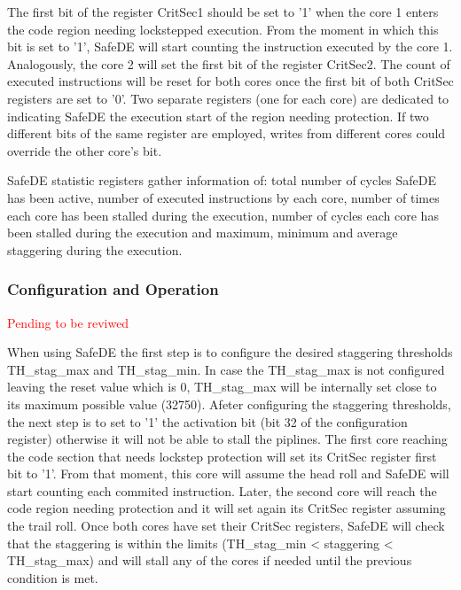 The first bit of the register CritSec1 should be set to '1' when the core 1 enters the code region needing lockstepped execution. From the moment in which this bit is set to '1', SafeDE will start counting the instruction executed by the core 1. Analogously, the core 2 will set the first bit of the register CritSec2. The count of executed instructions will be reset for both cores once the first bit of both CritSec registers are set to '0'. Two separate registers (one for each core) are dedicated to indicating SafeDE the execution start of the region needing protection. If two different bits of the same register are employed, writes from different cores could override the other core's bit.

SafeDE statistic registers gather information of: total number of cycles SafeDE has been active, number of executed instructions by each core, number of times each core has been stalled during the execution, number of cycles each core has been stalled during the execution and maximum, minimum and average staggering during the execution.


\bigskip

\subsubsection{Configuration and Operation}

\textcolor{red}{Pending to be reviwed}

When using SafeDE the first step is to configure the desired staggering thresholds TH\_stag\_max and TH\_stag\_min. In case the TH\_stag\_max is not configured leaving the reset value which is 0, TH\_stag\_max will be internally set close to its maximum possible value (32750). Afeter configuring the staggering thresholds, the next step is to set to '1' the activation bit (bit 32 of the configuration register) otherwise it will not be able to stall the piplines. The first core reaching the code section that needs lockstep protection will set its CritSec register first bit to '1'. From that moment, this core will assume the head roll and SafeDE will start counting each commited instruction. Later, the second core will reach the code region needing protection and it will set again its CritSec register assuming the trail roll. Once both cores have set their CritSec registers, SafeDE will check that the staggering is within the limits (TH\_stag\_min < staggering < TH\_stag\_max) and will stall any of the cores if needed until the previous condition is met.  

